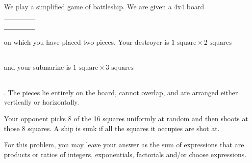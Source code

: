 \documentclass[12pt]{article}
\begin{document}
%
%

\begin{problem}{18}
We play a simplified game of battleship. We are given a 4x4 board
\begin{center}
    \begin{tabular}{| c | c | c | c |}
        \hline
        & & & \\ \hline
        & & & \\ \hline
        & & & \\ \hline
        & & & \\ \hline
    \end{tabular}
\end{center}
on which you have placed
two pieces. Your destroyer is $1 \text{ square} \times  2 \text{ squares}$
    \begin{tabular}{| c | c |}
        \rowcolor[gray]{0.8}
        \hline
        & \\ \hline
    \end{tabular}
    and your submarine is $1 \text{ square} \times 3 \text{ squares}$
    \begin{tabular}{| c | c | c |}
        \rowcolor[gray]{0.8}
        \hline
        & & \\ \hline
    \end{tabular}.
The pieces
lie entirely on the board, cannot overlap, and are
arranged either vertically or horizontally.

Your opponent picks 8 of the 16 squares uniformly at random and then shoots at those
8 squares. A ship is sunk if all the squares it occupies are shot at. 

For this problem, you may leave your answer as the sum of expressions that are products or ratios of integers, exponentials, factorials and/or choose expressions.


\end{problem}
\end{document}
